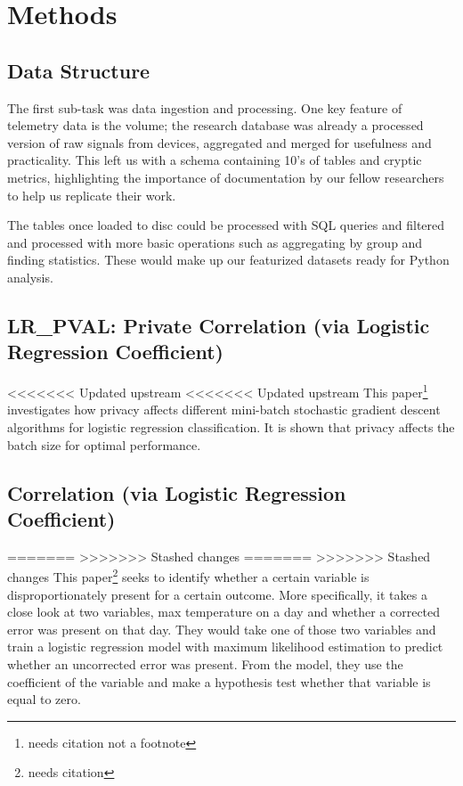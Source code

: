 \documentclass[12pt,letterpaper]{article}
\begin{document}
\begin{table}[h]

\section{Methods}

\subsection{Data Structure}

The first sub-task was data ingestion and processing. One key feature of telemetry data is the volume; the research database was already a processed version of raw signals from devices, aggregated and merged for usefulness and practicality. This left us with a schema containing 10's of tables and cryptic metrics, highlighting the importance of documentation by our fellow researchers to help us replicate their work.

The tables once loaded to disc could be processed with SQL queries and filtered and processed with more basic operations such as aggregating by group and finding statistics. These would make up our featurized datasets ready for Python analysis.

\subsection{LR\_PVAL: Private Correlation (via Logistic Regression Coefficient)}

<<<<<<< Updated upstream
<<<<<<< Updated upstream
This paper\footnote{needs citation not a footnote} investigates how privacy affects different mini-batch stochastic gradient descent algorithms for logistic regression classification. It is shown that privacy affects the batch size for optimal performance.

\subsection{Correlation (via Logistic Regression Coefficient)}

=======
>>>>>>> Stashed changes
=======
>>>>>>> Stashed changes
This paper\footnote{needs citation} seeks to identify whether a certain variable is disproportionately present for a certain outcome. 
More specifically, it takes a close look at two variables, max temperature on a day and whether a corrected error was present on that day. 
They would take one of those two variables and train a logistic regression model with maximum likelihood estimation to predict whether an uncorrected error was present.
From the model, they use the coefficient of the variable and make a hypothesis test whether that variable is equal to zero.


\end{table}
\end{document}
